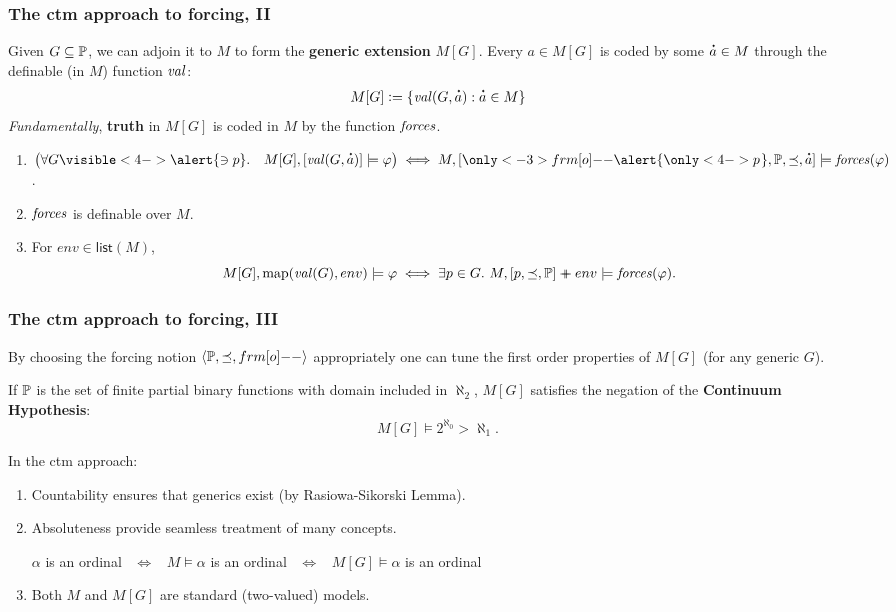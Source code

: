 \documentclass[english]{beamer}
\begin{document}
\begin{frame}
  \frametitle{The ctm approach to forcing, II}
  Given $G\subseteq \mathbb{P}$, we can adjoin it to $M$ to form the
  \textbf{generic extension} $M[G]$.
  \pause
  Every $a\in M[G]$ is coded by
  some $\punto{a}\in M$ through the definable (in $M$) function $\operatorname{\mathit{val}}$:
  \[
  M[G]\defi \{ \val(G,\punto{a}) : \punto{a}\in M\}
  \]
  \emph{Fundamentally}, \textbf{truth} in $M[G]$ is coded in $M$ by the
  function $\mathit{forces}$.
  \pause
  \begin{theorem}
    \begin{enumerate}
    \item $\bigl(\forall G\visible<4->{\alert{\ni p}}.\quad M[G], [\val(G,\punto{a})]
      \models \phi\bigr)
      \iff
      M,
      [\only<-3>{\1}\alert{\only<4->{p\hspace{0.2ex}}},\PP,\preceq,\punto{a}]\models
      \forceisa(\phi)$.
    \item $\mathit{forces}$ is definable over $M$.
      \pause%
      \pause%
    \item For $env\in\mathsf{list}(M)$,
      \[
      M[G], \mathrm{map}(\operatorname{\mathit{val}}(G),env) \models \varphi
      \iff
      \exists p\in G.\ M, [p,\preceq,\mathbb{P}] \mathbin{{+}\!\!\!\!{+}} env \models
      \mathit{forces}(\varphi).
      \]
    \end{enumerate}
  \end{theorem} 
\end{frame}

\begin{frame}
  \frametitle{The ctm approach to forcing, III}
  By choosing the forcing notion $\lb \PP, {\preceq} ,\1\rb$
  appropriately one can tune the first order properties of  $M[G]$ (for
  any generic $G$).
  \pause
  \begin{theorem}
    If $\mathbb{P}$ is the set of finite partial binary functions with domain
    included in $\aleph_2$, $M[G]$ satisfies the negation of the
    \textbf{Continuum Hypothesis}:
    \[
    M[G] \models 2^{\aleph_0} >\aleph_1.
    \]
  \end{theorem}
  \pause
  In the ctm approach:
  \begin{enumerate}
  \item<+-> Countability ensures that generics exist (by
    Rasiowa-Sikorski Lemma).
  \item<+-> Absoluteness provide seamless
    treatment of many concepts.
    \begin{center}
      $\alpha$ is an ordinal \ $\iff$ \  $M\models \alpha$ is
      an ordinal \  $\iff$ \  $M[G]\models \alpha$ is an ordinal
    \end{center}
  \item<+-> Both $M$ and $M[G]$ are standard (two-valued) models.
  \end{enumerate}
\end{frame}
\end{document}
